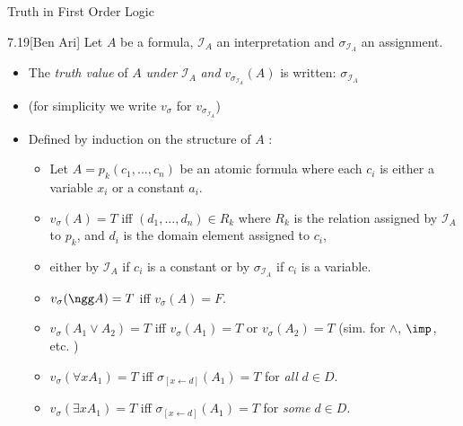 \begin{wideslide}[bm=,toc=]{Truth in First Order Logic}
\begin{defn}{7.19}[Ben Ari] Let $A$ be a formula, $\mathcal{I}_A$ an interpretation and
$\sigma_{\mathcal{I}_A}$ an assignment. 
\begin{itemize}
\item<2-> The \emph{truth value} of $A$ \emph{under} $\mathcal{I}_A$ \emph{and}
$v_{\sigma_{\mathcal{I}_A}}(A)$ is written: $\sigma_{\mathcal{I}_A}$
\item<3-> (for simplicity we write $v_{\sigma}$ for $v_{\sigma_{\mathcal{I}_A}}$)
\item<4-> Defined by induction on the structure of $A$ :
\begin{itemize}
\item<5->  Let $A = p_k(c_1,...,c_n)$ be an atomic formula where each $c_i$ is
either a variable $x_i$ or a constant $a_i$. 
\item<6->  $v_{\sigma}(A) = T$ iff $(d_1,...,d_n)
\in R_k$ where $R_k$ is the relation assigned by $\mathcal{I}_A$ to $p_k$, and
$d_i$ is the domain element assigned to $c_i$, 
\item<7->  either by $\mathcal{I}_A$ if $c_i$ is a constant or by $\sigma_{\mathcal{I}_A}$ 
      if $c_i$ is a variable.
\item<8-> $v_{\sigma}(\ngg A) = T$ iff $v_{\sigma}(A) = F$.
\item<9-> $v_{\sigma}(A_1 \lor A_2) = T$ iff $v_{\sigma}(A_1) = T$ or
$v_{\sigma}(A_2) = T$ (sim. for $\land$, $\imp$, etc. ) 
\item<10->  $v_{\sigma}(\forall x A_1) = T$ iff $\sigma_{[x \leftarrow d]}(A_1) = T$
for \emph{all} $d \in D$.
\item<11->  $v_{\sigma}(\exists x A_1) = T$ iff $\sigma_{[x \leftarrow d]}(A_1) = T$
for \emph{some} $d \in D$.
\end{itemize}
\end{itemize}
\end{defn}
\end{wideslide}

